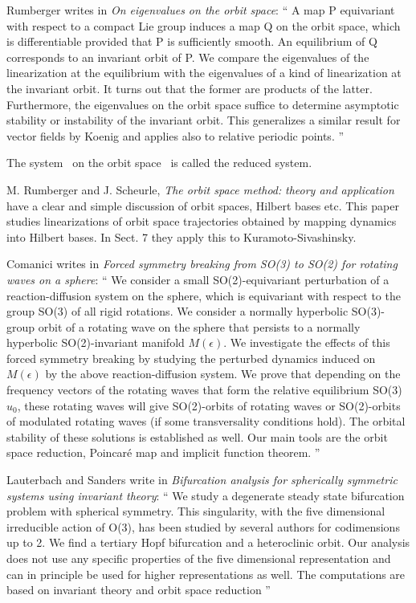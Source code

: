 \begin{description}
Rumberger writes in
\emph{On eigenvalues on the orbit space}: ``
A map P equivariant with respect to a compact Lie group induces a map Q
on the orbit space, which is differentiable provided that P is
sufficiently smooth. An equilibrium of Q corresponds to an invariant
orbit of P. We compare the eigenvalues of the linearization at the
equilibrium with the eigenvalues of a kind of linearization at the
invariant orbit. It turns out that the former are products of the latter.
Furthermore, the eigenvalues on the orbit space suffice to determine
asymptotic stability or instability of the invariant orbit. This
generalizes a similar result for vector fields by Koenig
and applies also to relative periodic points.
''

                                    \toCB
The system \mapRed\ on the orbit space \pSRed\ is called the reduced system.

M. Rumberger and J. Scheurle,
{\emph{The orbit space method:}}
\emph{theory and application}
have a clear and simple discussion of orbit spaces,
Hilbert bases etc. This paper studies linearizations of orbit space
trajectories obtained by mapping dynamics into Hilbert bases.
In Sect. 7 they apply this to Kuramoto-Sivashinsky.

Comanici writes in \emph{Forced symmetry breaking from SO(3) to SO(2) for rotating
            waves on a sphere}: ``
We consider a small SO(2)-equivariant perturbation of a
reaction-diffusion system on the sphere, which is equivariant with
respect to the group SO(3) of all rigid rotations. We consider a normally
hyperbolic SO(3)-group orbit of a rotating wave on the sphere that
persists to a normally hyperbolic SO(2)-invariant manifold $M(\epsilon)$.
We investigate the effects of this forced symmetry breaking by studying
the perturbed dynamics induced on $M(\epsilon)$ by the above
reaction-diffusion system. We prove that depending on the frequency
vectors of the rotating waves that form the relative equilibrium
SO(3) $u_{0}$, these rotating waves will give SO(2)-orbits of rotating waves
or SO(2)-orbits of modulated rotating waves (if some transversality
conditions hold). The orbital stability of these solutions is established
as well. Our main tools are the orbit space reduction, Poincar\'e map and
implicit function theorem.
''

Lauterbach and Sanders write in \emph{Bifurcation analysis for
spherically symmetric systems using invariant theory}: ``
We study a degenerate steady state bifurcation problem with spherical
symmetry. This singularity, with the five dimensional irreducible action
of O(3), has been studied by several authors for codimensions up to 2.
We find a tertiary Hopf bifurcation and a
heteroclinic orbit. Our analysis does not use any specific properties of
the five dimensional representation and can in principle be used for
higher representations as well. The computations are based on invariant
theory and orbit space reduction
''


\end{description}
